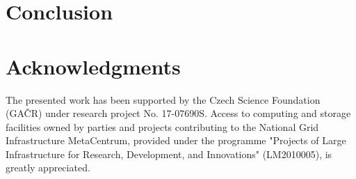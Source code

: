 \documentclass{svmult}
\begin{document}
\section{Conclusion }


\section{Acknowledgments}

The presented work has been supported by the Czech Science Foundation (GA{\v C}R) under research project No. 17-07690S.
Access to computing and storage facilities owned by parties and projects contributing to the National Grid Infrastructure MetaCentrum, provided under the programme "Projects of Large Infrastructure for Research, Development, and Innovations" (LM2010005), is greatly appreciated.




\end{document}
